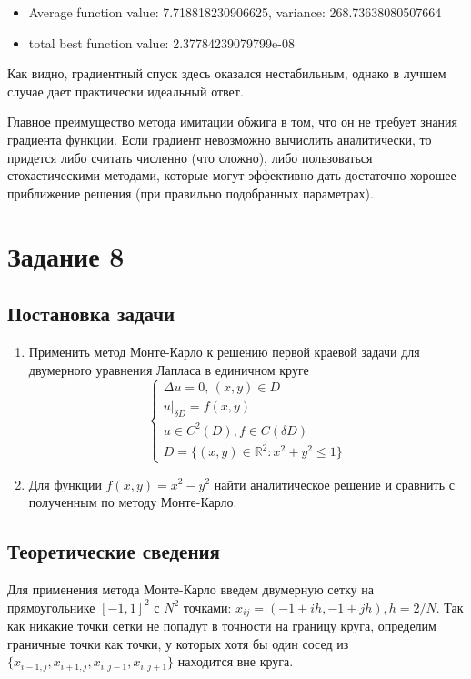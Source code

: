 \documentclass{article}
\theoremstyle{definition}
\begin{document}
\begin{itemize}
    \item[] Average function value: 7.718818230906625, variance: 268.73638080507664
    \item[] total best function value: 2.37784239079799e-08
\end{itemize}

Как видно, градиентный спуск здесь оказался нестабильным, однако в лучшем случае дает практически идеальный ответ.

Главное преимущество метода имитации обжига в том, что он не требует знания градиента функции. Если градиент невозможно вычислить аналитически, то придется либо считать численно (что сложно), либо пользоваться стохастическими методами, которые могут эффективно дать достаточно хорошее приближение решения (при правильно подобранных параметрах).

\section{Задание 8}
\subsection{Постановка задачи}
\begin{enumerate}
    \item Применить метод Монте-Карло к решению первой краевой задачи для двумерного уравнения Лапласа в единичном круге
    $$ \begin{cases}
\Delta u = 0,\, (x, y) \in D\\
u\vert_{\delta D} = f(x, y)\\
u \in C^2(D), f \in C(\delta D)\\
D = \{(x, y) \in \mathbb{R}^2: x^2 + y^2 \leqslant 1\}
\end{cases} $$ 
    \item Для функции \(f(x, y) = x^2 - y^2\) найти аналитическое решение и сравнить с полученным по методу Монте-Карло.
\end{enumerate}

\subsection{Теоретические сведения}

Для применения метода Монте-Карло введем двумерную сетку на прямоугольнике $[-1, 1]^2$ с $N^2$ точками: ${x_{ij} = (-1 + ih, -1 + jh)}, h = 2/N$. Так как никакие точки сетки не попадут в точности на границу круга, определим граничные точки как точки, у которых хотя бы один сосед из $\{x_{i-1, j}, x_{i+1,j}, x_{i,j-1}, x_{i,j+1}\}$ находится вне круга.
\end{document}
